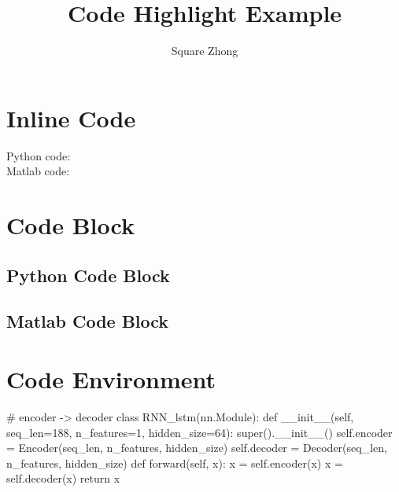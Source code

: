 \documentclass[a4paper]{article}
\title{Code Highlight Example}
\author{Square Zhong}
\begin{document}
\maketitle

\section{Inline Code}
Python code: \\
Matlab code: 

\section{Code Block}
\subsection{Python Code Block}
\subsection{Matlab Code Block}

\section{Code Environment}
\begin{python}
# encoder -> decoder
class RNN_lstm(nn.Module):
    def __init__(self, seq_len=188, n_features=1, hidden_size=64):
        super().__init__()
        self.encoder = Encoder(seq_len, n_features, hidden_size)
        self.decoder = Decoder(seq_len, n_features, hidden_size)
    def forward(self, x):
        x = self.encoder(x)
        x = self.decoder(x)
        return x
\end{python}
\end{document}
